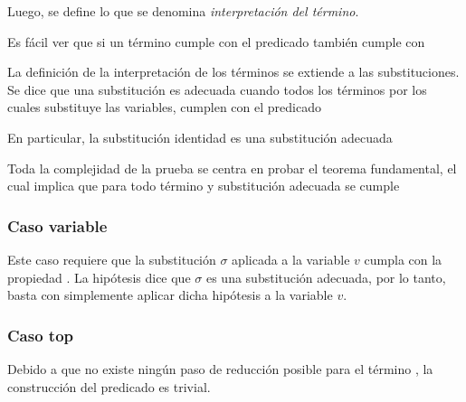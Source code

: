 
Luego, se define lo que se denomina \textit{interpretación del término}.


Es fácil ver que si un término cumple con el predicado  también cumple con 


La definición de la interpretación de los términos se extiende a las substituciones.
Se dice que una substitución es adecuada cuando todos los términos por los cuales substituye las variables, cumplen con el predicado \snstar


En particular, la substitución identidad  es una substitución adecuada


Toda la complejidad de la prueba se centra en probar el teorema fundamental, el cual implica que para todo término  y substitución adecuada  se cumple
\snstar{}


\subsubsection{Caso variable}

Este caso requiere que la substitución $\sigma$ aplicada a la variable $v$ cumpla con la propiedad
\snstar.
La hipótesis dice que $\sigma$ es una substitución adecuada, por lo tanto, basta con simplemente aplicar dicha hipótesis a la variable $v$.


\subsubsection{Caso top}

Debido a que no existe ningún paso de reducción posible para el término \const{$\star$}, la construcción del predicado es trivial.


